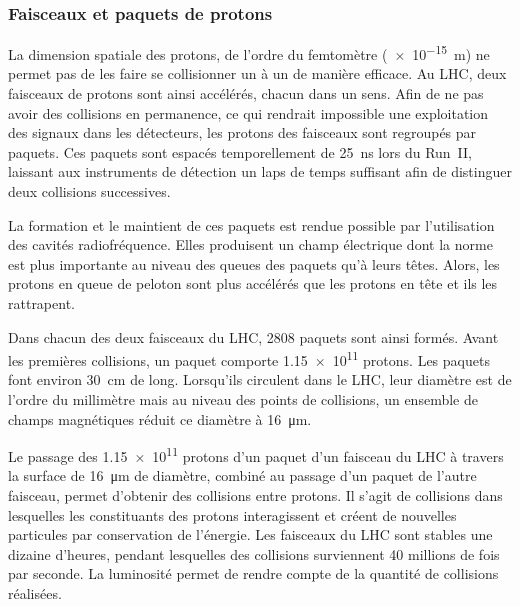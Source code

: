 \subsubsection{Faisceaux et paquets de protons}
La dimension spatiale des protons, de l'ordre du femtomètre (\SI{e-15}{\meter}) ne permet pas de les faire se collisionner un à un de manière efficace.
Au LHC, deux faisceaux de protons sont ainsi accélérés, chacun dans un sens.
Afin de ne pas avoir des collisions en permanence, ce qui rendrait impossible une exploitation des signaux dans les détecteurs, les protons des faisceaux sont regroupés par paquets.
Ces paquets sont espacés temporellement de \SI{25}{\nano\second} lors du Run~II, laissant aux instruments de détection un laps de temps suffisant afin de distinguer deux collisions successives.
\par La formation et le maintient de ces paquets est rendue possible par l'utilisation des cavités radiofréquence.
Elles produisent un champ électrique dont la norme est plus importante au niveau des queues des paquets qu'à leurs têtes.
Alors, les protons \og en queue de peloton \fg{} sont plus accélérés que les protons en tête et ils les rattrapent.
\par Dans chacun des deux faisceaux du LHC, 2808 paquets sont ainsi formés.
Avant les premières collisions, un paquet comporte \num{1.15e11} protons.
Les paquets font environ \SI{30}{\centi\meter} de long.
Lorsqu'ils circulent dans le LHC, leur diamètre est de l'ordre du millimètre mais au niveau des points de collisions, un ensemble de champs magnétiques réduit ce diamètre à \SI{16}{\micro\meter}.
\par Le passage des \num{1.15e11} protons d'un paquet d'un faisceau du LHC à travers la surface de \SI{16}{\micro\meter} de diamètre, combiné au passage d'un paquet de l'autre faisceau, permet d'obtenir des collisions entre protons.
Il s'agit de collisions dans lesquelles les constituants des protons interagissent et créent de nouvelles particules par conservation de l'énergie.
Les faisceaux du LHC sont stables une dizaine d'heures, pendant lesquelles des collisions surviennent 40 millions de fois par seconde.
La luminosité permet de rendre compte de la quantité de collisions réalisées.
